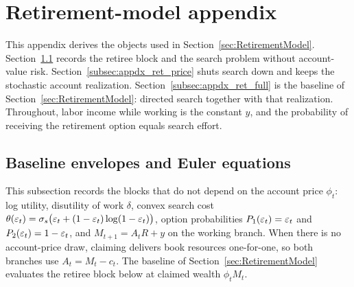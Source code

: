 \section{Retirement-model appendix}\label{sec:appdx_retirement}
This appendix derives the objects used in Section~\ref{sec:RetirementModel}. Section~\ref{subsec:appdx_ret_baseline} records the retiree block and the search problem without account-value risk. Section~\ref{subsec:appdx_ret_price} shuts search down and keeps the stochastic account realization. Section~\ref{subsec:appdx_ret_full} is the baseline of Section~\ref{sec:RetirementModel}: directed search together with that realization. Throughout, labor income while working is the constant $y$, and the probability of receiving the retirement option equals search effort.

\subsection{Baseline envelopes and Euler equations}\label{subsec:appdx_ret_baseline}
This subsection records the blocks that do not depend on the account price $\phi_t$: log utility, disutility of work $\delta$, convex search cost $\theta(\varepsilon_t)=\sigma_s\bigl(\varepsilon_t+(1-\varepsilon_t)\log(1-\varepsilon_t)\bigr)$, option probabilities $P_1(\varepsilon_t)=\varepsilon_t$ and $P_2(\varepsilon_t)=1-\varepsilon_t$, and $M_{t+1}=A_t R+y$ on the working branch. When there is no account-price draw, claiming delivers book resources one-for-one, so both branches use $A_t=M_t-c_t$. The baseline of Section~\ref{sec:RetirementModel} evaluates the retiree block below at claimed wealth $\phi_t M_t$.

